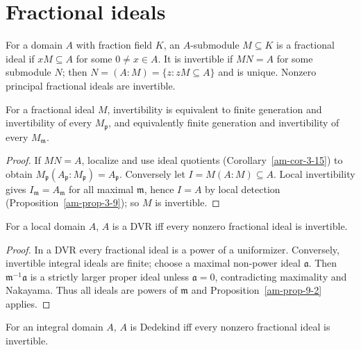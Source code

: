 \section{Fractional ideals}
\label{am-ch9-fractional}
\begin{definition}
\label{am-def-fractional-ideal}
\uses{}
For a domain $A$ with fraction field $K$, an $A$-submodule $M\subseteq K$ is a
fractional ideal if $xM\subseteq A$ for some $0\ne x\in A$.  It is invertible
if $MN=A$ for some submodule $N$; then $N=(A:M)=\{z:zM\subseteq A\}$ and
is unique.  Nonzero principal fractional ideals are invertible.
\end{definition}
\begin{proposition}
\label{am-prop-9-6}
\uses{}
For a fractional ideal $M$, invertibility is equivalent to finite generation
and invertibility of every $M_\mathfrak{p}$, and equivalently finite generation and
invertibility of every $M_\mathfrak{m}$.
\end{proposition}
\begin{proof}
If $MN=A$, localize and use ideal quotients (Corollary~\ref{am-cor-3-15}) to
obtain $M_\mathfrak{p}(A_\mathfrak{p}:M_\mathfrak{p})=A_\mathfrak{p}$.  Conversely let
$I=M(A:M)\subseteq A$.  Local invertibility gives $I_\mathfrak{m}=A_\mathfrak{m}$ for all maximal
$\mathfrak{m}$, hence $I=A$ by local detection (Proposition~\ref{am-prop-3-9}); so
$M$ is invertible.
\end{proof}
\begin{proposition}
\label{am-prop-9-7}
\uses{}
For a local domain $A$, $A$ is a DVR iff every nonzero fractional ideal is
invertible.
\end{proposition}
\begin{proof}
In a DVR every fractional ideal is a power of a uniformizer.  Conversely,
invertible integral ideals are finite; choose a maximal non-power ideal $\mathfrak{a}$.
Then $\mathfrak{m}^{-1}\mathfrak{a}$ is a strictly larger proper ideal unless $\mathfrak{a}=0$,
contradicting maximality and Nakayama.  Thus all ideals are powers of $\mathfrak{m}$ and
Proposition~\ref{am-prop-9-2} applies.
\end{proof}
\begin{theorem}
\label{am-thm-9-8}
\uses{}
For an integral domain $A$, $A$ is Dedekind iff every nonzero fractional ideal
is invertible.
\end{theorem}
